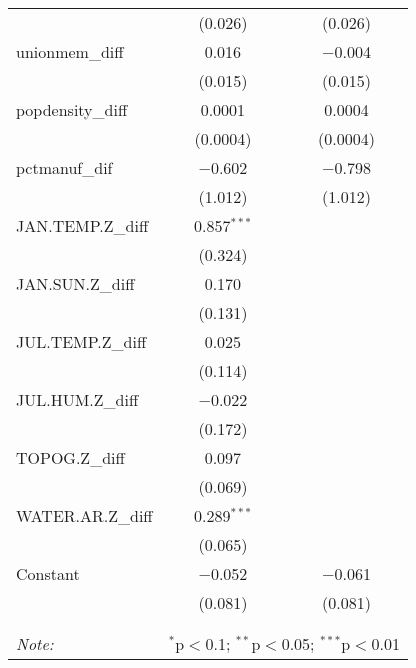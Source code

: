 \begin{table}[!htbp]
\begin{tabular}{@{\extracolsep{5pt}}lcc}
  & (0.026) & (0.026) \\ 
  unionmem\_diff & 0.016 & $-$0.004 \\ 
  & (0.015) & (0.015) \\ 
  popdensity\_diff & 0.0001 & 0.0004 \\ 
  & (0.0004) & (0.0004) \\ 
  pctmanuf\_dif & $-$0.602 & $-$0.798 \\ 
  & (1.012) & (1.012) \\ 
  JAN.TEMP.Z\_diff & 0.857$^{***}$ &  \\ 
  & (0.324) &  \\ 
  JAN.SUN.Z\_diff & 0.170 &  \\ 
  & (0.131) &  \\ 
  JUL.TEMP.Z\_diff & 0.025 &  \\ 
  & (0.114) &  \\ 
  JUL.HUM.Z\_diff & $-$0.022 &  \\ 
  & (0.172) &  \\ 
  TOPOG.Z\_diff & 0.097 &  \\ 
  & (0.069) &  \\ 
  WATER.AR.Z\_diff & 0.289$^{***}$ &  \\ 
  & (0.065) &  \\ 
  Constant & $-$0.052 & $-$0.061 \\ 
  & (0.081) & (0.081) \\ 
 \hline \\[-1.8ex] 
\hline 
\hline \\[-1.8ex] 
\textit{Note:}  & \multicolumn{2}{r}{$^{*}$p$<$0.1; $^{**}$p$<$0.05; $^{***}$p$<$0.01} \\ 
\end{tabular} 
\end{table} 
